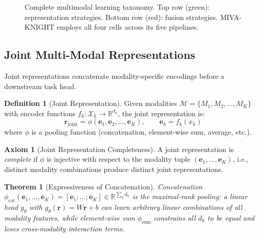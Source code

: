 \documentclass[12pt,a4paper]{article}
\theoremstyle{definition}
\newtheorem{definition}{Definition}[section]
\newtheorem{axiom}{Axiom}[section]
\theoremstyle{plain}
\newtheorem{theorem}{Theorem}[section]
\theoremstyle{remark}
\newcommand{\R}{\mathbb{R}}
\begin{document}
\begin{figure}[H]
{
}
\caption{Complete multimodal learning taxonomy. Top row (green): representation strategies. Bottom row (red): fusion strategies. MIVA-KNIGHT employs all four cells across its five pipelines.}
\label{fig:taxonomy_overview}
\end{figure}

\subsection{Joint Multi-Modal Representations}

Joint representations concatenate modality-specific encodings before a downstream task head.

\begin{definition}[Joint Representation]
Given modalities $\mathcal{M} = \{M_1, M_2, \ldots, M_K\}$ with encoder functions $f_k : \mathcal{X}_k \to \R^{d_k}$, the joint representation is:
\[
  \mathbf{r}_{\text{joint}} = \phi\!\left(\mathbf{e}_1, \mathbf{e}_2, \ldots, \mathbf{e}_K\right), \qquad \mathbf{e}_k = f_k(x_k)
\]
where $\phi$ is a pooling function (concatenation, element-wise sum, average, etc.).
\end{definition}

\begin{axiom}[Joint Representation Completeness]
A joint representation is \emph{complete} if $\phi$ is injective with respect to the modality tuple $(\mathbf{e}_1,\ldots,\mathbf{e}_K)$, i.e., distinct modality combinations produce distinct joint representations.
\end{axiom}

\begin{theorem}[Expressiveness of Concatenation]
Concatenation $\phi_{\text{cat}}(\mathbf{e}_1,\ldots,\mathbf{e}_K) = [\mathbf{e}_1;\ldots;\mathbf{e}_K] \in \R^{\sum_k d_k}$ is the maximal-rank pooling: a linear head $g_\theta$ with $g_\theta(\mathbf{r}) = W\mathbf{r} + b$ can learn arbitrary linear combinations of all modality features, while element-wise sum $\phi_{\text{sum}}$ constrains all $d_k$ to be equal and loses cross-modality interaction terms.
\end{theorem}
\end{document}
